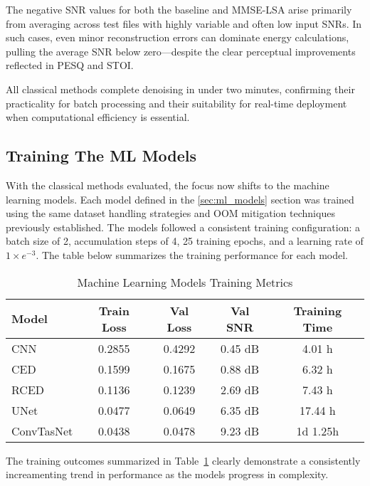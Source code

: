 The negative SNR values for both the baseline and MMSE-LSA arise primarily from averaging across test files with highly variable and often low input SNRs. In such cases, even minor reconstruction errors can dominate energy calculations, pulling the average SNR below zero—despite the clear perceptual improvements reflected in PESQ and STOI.

All classical methods complete denoising in under two minutes, confirming their practicality for batch processing and their suitability for real-time deployment when computational efficiency is essential.

\subsection{Training The ML Models}
\label{sec:training_ml_models}

With the classical methods evaluated, the focus now shifts to the machine learning models. Each model defined in the \ref{sec:ml_models} section was trained using the same dataset handling strategies and OOM mitigation techniques previously established. The models followed a consistent training configuration: a batch size of 2, accumulation steps of 4, 25 training epochs, and a learning rate of $1 \times e^{-3}$. The table below summarizes the training performance for each model.

\vspace{1em}
\begin{table}[H]
\centering
\caption{Machine Learning Models Training Metrics}
\label{tab:ml_training}
\begin{tabular}{|l|c|c|c|c|}
\hline
\textbf{Model} & \textbf{Train Loss} & \textbf{Val Loss} & \textbf{Val SNR} & \textbf{Training Time} \\
\hline
CNN         & 0.2855 & 0.4292 & 0.45 dB & 4.01 h \\
CED         & 0.1599 & 0.1675 & 0.88 dB & 6.32 h \\
RCED        & 0.1136 & 0.1239 & 2.69 dB & 7.43 h \\
UNet        & 0.0477 & 0.0649 & 6.35 dB & 17.44 h \\
ConvTasNet  & 0.0438 & 0.0478 & 9.23 dB & 1d 1.25h \\
\hline
\end{tabular}
\end{table}

The training outcomes summarized in Table~\ref{tab:ml_training} clearly demonstrate a consistently increamenting trend in performance as the models progress in complexity. 

